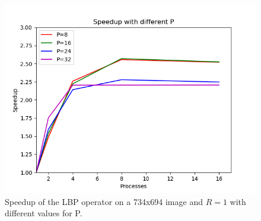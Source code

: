 \documentclass[10pt,twocolumn,letterpaper]{article}
\begin{document}
\begin{figure}[H]
	\includegraphics[width=\linewidth]{images/speedup_by_p.png}
	\caption{Speedup of the LBP operator on a 734x694 image and $R = 1$ with different values for P.}
	\label{fig:speedup_kernel}
\end{figure}
\end{document}
